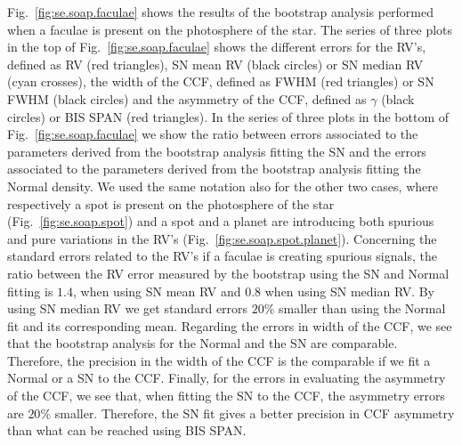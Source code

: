 \documentclass{aa}
\begin{document}
Fig.~\ref{fig:se.soap.faculae} shows the results of the bootstrap analysis performed when a faculae is present on the photosphere of the star. The series of three plots in the top of Fig.~\ref{fig:se.soap.faculae} shows the different errors for the RV's, defined as RV (red triangles), SN mean RV (black circles) or SN median RV (cyan crosses), the width of the CCF, defined as FWHM (red triangles) or SN FWHM (black circles) and the asymmetry of the CCF, defined as $\gamma$ (black circles) or BIS SPAN (red triangles). In the series of three plots in the bottom of Fig.~\ref{fig:se.soap.faculae} we show the ratio between errors associated to the parameters derived from the bootstrap analysis fitting the SN and the errors associated to the parameters derived from the bootstrap analysis fitting the Normal density.  We used the same notation also for the other two cases, where respectively a spot is present on the photosphere of the star (Fig.~\ref{fig:se.soap.spot}) and a spot and a planet are introducing both spurious and pure variations in the RV's (Fig.~\ref{fig:se.soap.spot.planet}). Concerning the standard errors related to the RV's if a faculae is creating spurious signals, the ratio between the RV error measured by the bootstrap using the SN and Normal fitting is $1.4$, when using SN mean RV and $0.8$ when using SN median RV. By using SN median RV we get standard errors $20\%$ smaller than using the Normal fit and its corresponding mean. Regarding the errors in width of the CCF, we see that the bootstrap analysis for the Normal and the SN are comparable. Therefore, the precision in the width of the CCF is the comparable if we fit a Normal or a SN to the CCF. Finally, for the errors in evaluating the asymmetry of the CCF, we see that, when fitting the SN to the CCF, the asymmetry errors are $20\%$ smaller. Therefore, the SN fit gives a better precision in CCF asymmetry than what can be reached using BIS SPAN.
\end{document}
